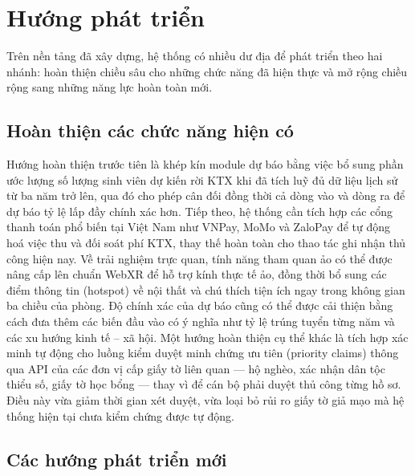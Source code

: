 \documentclass[../DoAn.tex]{subfiles}
\begin{document}
\section{Hướng phát triển}
\label{section:6.2}

Trên nền tảng đã xây dựng, hệ thống có nhiều dư địa để phát triển theo hai
nhánh: hoàn thiện chiều sâu cho những chức năng đã hiện thực và mở rộng chiều
rộng sang những năng lực hoàn toàn mới.

\subsection{Hoàn thiện các chức năng hiện có}
\label{subsection:6.2.1}

Hướng hoàn thiện trước tiên là khép kín module dự báo bằng việc bổ sung phần
ước lượng số lượng sinh viên dự kiến rời KTX khi đã tích luỹ đủ dữ liệu lịch
sử từ ba năm trở lên, qua đó cho phép cân đối đồng thời cả dòng vào và dòng ra
để dự báo tỷ lệ lấp đầy chính xác hơn. Tiếp theo, hệ thống cần tích hợp các
cổng thanh toán phổ biến tại Việt Nam như VNPay, MoMo và ZaloPay để tự động hoá
việc thu và đối soát phí KTX, thay thế hoàn toàn cho thao tác ghi nhận thủ công
hiện nay. Về trải nghiệm trực quan, tính năng tham quan ảo có thể được nâng cấp
lên chuẩn WebXR để hỗ trợ kính thực tế ảo, đồng thời bổ sung các điểm thông tin
(hotspot) về nội thất và chú thích tiện ích ngay trong không gian ba chiều của
phòng. Độ chính xác của dự báo cũng có thể được cải thiện bằng cách đưa thêm
các biến đầu vào có ý nghĩa như tỷ lệ trúng tuyển từng năm và các xu hướng kinh
tế -- xã hội. Một hướng hoàn thiện cụ thể khác là tích hợp xác minh tự động cho
luồng kiểm duyệt minh chứng ưu tiên (priority claims) thông qua API của các đơn
vị cấp giấy tờ liên quan --- hộ nghèo, xác nhận dân tộc thiểu số, giấy tờ học
bổng --- thay vì để cán bộ phải duyệt thủ công từng hồ sơ. Điều này vừa giảm
thời gian xét duyệt, vừa loại bỏ rủi ro giấy tờ giả mạo mà hệ thống hiện tại
chưa kiểm chứng được tự động.

\subsection{Các hướng phát triển mới}
\label{subsection:6.2.2}
\end{document}
